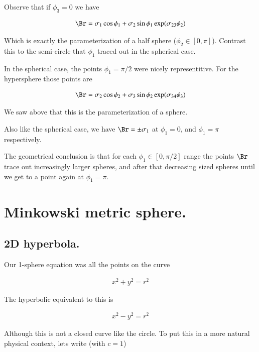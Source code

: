 \documentclass{article}
\begin{document}
\begin{itemize}
Observe that if $\phi_3 = 0$ we have

\begin{align*}
\Br
&= \sigma_1 \cos\phi_1 + \sigma_2 \sin\phi_1 \exp( \sigma_{23} \phi_2 ) \\
\end{align*}

Which is exactly the parameterization of a half sphere ($\phi_2 \in [0,\pi]$).  Contrast this to the semi-circle that $\phi_1$ traced out in the spherical case.  

In the spherical case, the points $\phi_1 = \pi/2$ were nicely representitive.  For the hypersphere those points are

\begin{align*}
\Br &= \sigma_2 \cos\phi_2 + \sigma_3 \sin\phi_2 \exp(\sigma_{34}\phi_3) \\
\end{align*}

We saw above that this is the parameterization of a sphere.

Also like the spherical case, we have $\Br = \pm \sigma_1$ at $\phi_1 = 0$, and $\phi_1 = \pi$ respectively.

The geometrical conclusion is that for each $\phi_1 \in [0,\pi/2]$ range the points $\Br$ trace out increasingly
larger spheres, and after that decreasing sized spheres until we get to a point again at $\phi_1 = \pi$.

\end{itemize}

\section{ Minkowski metric sphere. }

\subsection{ 2D hyperbola. }

Our 1-sphere equation was all the points on the curve

\begin{align*}
x^2 + y^2 = r^2
\end{align*}

The hyperbolic equivalent to this is

\begin{align*}
x^2 - y^2 = r^2
\end{align*}

Although this is not a closed curve like the circle.  To put this in a 
more natural physical context, lets write (with $c=1$)
\end{document}
